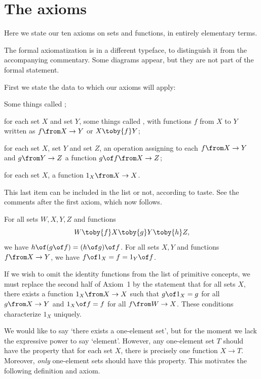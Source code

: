 \documentclass[12pt]{article}
\begin{document}
\section{The axioms} 
\label{sec:axioms}


Here we state our ten axioms on sets and functions, in entirely elementary
terms.

The formal axiomatization is in a \fmlon different typeface\fmloff, to
distinguish it from the accompanying commentary.  Some diagrams appear, but
they are not part of the formal statement.

First we state the data to which our axioms will apply:
% 
\fmlon
\begin{myitemize}
\item Some things called ;

\item for each set $X$ and set $Y$, some things called , with functions $f$ from $X$ to $Y$ written as $f\from
X \to Y$ or $X \toby{f} Y$;

\item for each set $X$, set $Y$ and set $Z$, an operation assigning to each
$f\from X \to Y$ and $g\from Y \to Z$ a function $g\of f\from X \to Z$;

\item for each set $X$, a function $1_X\from X \to X$.
\end{myitemize}
\fmloff

This last item can be included in the list or not, according to taste.  See
the comments after the first axiom, which now follows.


% 
\begin{axiom}
For all sets $W, X, Y, Z$ and functions 
\[
W \toby{f} X \toby{g} Y \toby{h} Z,
\]
we have $h \of (g\of f) = (h \of g) \of f$.  For all sets $X, Y$ and functions
$f\from X \to Y$, we have $f \of 1_X = f = 1_Y \of f$.
\end{axiom}
If we wish to omit the identity functions from the list of primitive
concepts, we must replace the second half of Axiom~1 by the statement
that for all sets $X$, there exists a function $1_X \from X \to X$ such
that $g \of 1_X = g$ for all $g\from X \to Y$ and $1_X \of f = f$ for all
$f\from W \to X$.  These conditions characterize $1_X$ uniquely.


% 
We would like to say `there exists a one-element set', but for the moment
we lack the expressive power to say `element'.  However, any one-element
set $T$ should have the property that for each set $X$, there is precisely
one function $X \to T$.  Moreover, \emph{only} one-element sets should have
this property.  This motivates the following definition and axiom.
\end{document}
